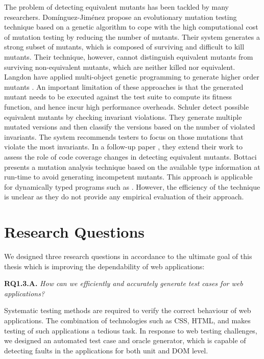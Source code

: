 The problem of detecting equivalent mutants has been tackled by many researchers.
Dom\'inguez-Jim\'enez \etal \cite{dominguez:ist11} propose an evolutionary mutation testing
technique based on a genetic algorithm to cope with the high computational cost of mutation 
testing by reducing the number of mutants. Their system generates a strong subset
of mutants, which is composed of surviving and difficult to kill mutants. 
Their technique, however, cannot distinguish equivalent mutants from surviving non-equivalent mutants, which are neither killed nor
equivalent.
Langdon \etal have applied multi-object genetic programming to generate higher order mutants 
\cite{langdon:jss10}.
An important limitation of these approaches is that the generated
mutant needs to be executed against the test suite to compute its fitness function, and hence incur high performance overheads.
Schuler \etal \cite{schuler:issta09} detect possible equivalent mutants by checking invariant violations. They
generate multiple mutated versions and then classify the versions based on the number of violated invariants.
The system recommends testers to focus on those mutations that violate the most invariants.
In a follow-up paper \cite{schuler:icst10}, they extend their work to assess the role of code coverage changes in detecting equivalent mutants. 
Bottaci \cite{bottaci:icstw10} presents a mutation analysis technique based on the available type information at run-time to avoid generating incompetent mutants. This approach is applicable for dynamically typed programs such as \javascript. However, the efficiency of the technique is unclear as they do not provide any empirical evaluation of their approach. 

\section{Research Questions} \label{Sec:researchq}
We designed three research questions in accordance to the ultimate goal of this thesis which is improving the dependability of \javascript web applications:

{\bf RQ1.3.A.} \emph{How can we efficiently and accurately generate test cases for \javascript web applications?}

Systematic testing methods are required to verify the correct behaviour of web applications. The combination of technologies such as CSS, HTML, and \javascript makes testing of such applications a tedious task.
In response to web testing challenges, we designed an automated test case and oracle generator, which is capable of detecting faults
in the \javascript applications for both unit and DOM level.

